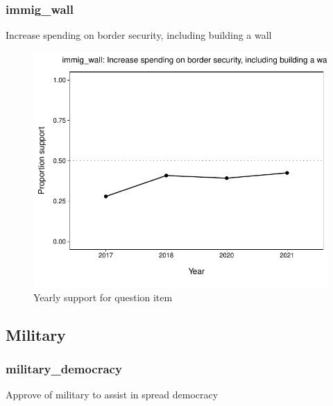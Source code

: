 \documentclass[
  12pt]{article}
\begin{document}
\hypertarget{immig_wall}{%
\subsubsection{immig\_wall}\label{immig_wall}}

Increase spending on border security, including building a wall

\begin{figure}

{\centering \includegraphics{error-checking_files/figure-latex/unnamed-chunk-3-28} 

}

\caption{Yearly support for question item}\label{fig:unnamed-chunk-3-28}
\end{figure}

\newpage

\hypertarget{military}{%
\subsection{Military}\label{military}}

\hypertarget{military_democracy}{%
\subsubsection{military\_democracy}\label{military_democracy}}

Approve of military to assist in spread democracy
\end{document}
